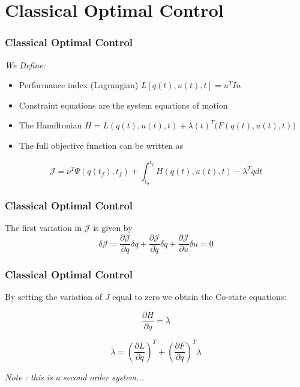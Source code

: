 \documentclass{beamer}
\begin{document}
\section{Classical Optimal Control}


\begin{frame}
\frametitle{Classical Optimal Control}

\textit{We Define:}
\begin{itemize}
	\item Performance index (Lagrangian) $ L[q(t),u(t),t] = u^T I u $
	\item Constraint equations are the system equations of motion
	\item The Hamiltonian $H = L(q(t),u(t),t) + \lambda(t)^T \big( F(q(t),u(t),t) \big)$
      \item  The full objective function can be written as
\end{itemize}

\begin{equation}
    \mathcal{ J } = \nu^T \Psi ( q(t_f),t_f ) + \int_{t_0}^{t_f}  H(q(t),u(t),t) - \lambda^T \ddot q  dt
\end{equation}


\end{frame}



\begin{frame}
\frametitle{Classical Optimal Control}

The first variation in  $\mathcal{J}$ is given by\\

\begin{equation}
    \delta \mathcal{  J  } = \frac{\partial \mathcal{  J  }}{\partial q} \delta q + \frac{\partial \mathcal{  J  }}{\partial \dot q} \delta \dot q   +  \frac{\partial \mathcal{  J  }}{\partial u} \delta u = 0
\end{equation}


\end{frame}




\begin{frame}
\frametitle{Classical Optimal Control}

By setting the variation of $J$ equal to zero we obtain the Co-state equations:

\begin{equation}
\frac{\partial H}{ \partial q } = \ddot \lambda
\end{equation}

\begin{equation}
\ddot \lambda = ( \frac{\partial L}{\partial q}  )^T + ( \frac{\partial F}{\partial q} )^T \lambda
\end{equation}

\textit{Note : this is a second order system...}


\end{frame}
\end{document}
